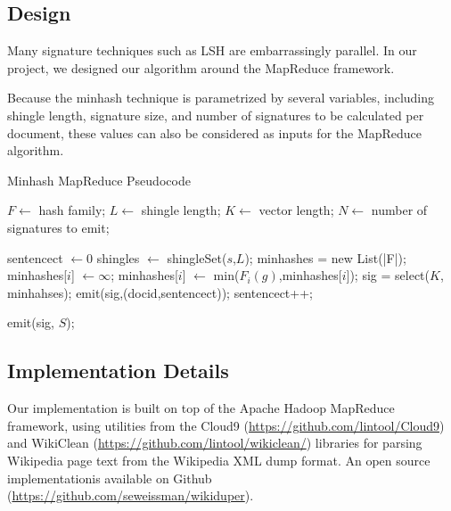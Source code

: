 \documentclass{acm_proc_article-sp}
\begin{document}
\subsection{Design}
Many signature techniques such as LSH are embarrassingly parallel. In our project, we designed our algorithm around the MapReduce framework.

Because the minhash technique is parametrized by several variables, including shingle length, signature size, and number of signatures to be calculated per document, these values can also be considered as inputs for the MapReduce algorithm.

\begin{table}
\begin{algorithm}[H]
\caption{Minhash MapReduce Pseudocode}
\begin{algorithmic}
 \State $F \gets $ hash family;
 \State $L \gets $ shingle length;
 \State $K \gets $ vector length;
 \State $N \gets $ number of signatures to emit;
\EndFunction

 \State sentencect $\gets 0$
  \State shingles $\gets$ shingleSet($s$,$L$);
  \State minhashes = new List(|F|);
    \State minhashes[$i$] $\gets \infty$;
   \EndFor
     \State minhashes[$i$] $\gets$ min($F_i(g)$,minhashes[$i$]);
    \EndFor
   \EndFor
   \State sig = select($K$, minhahses);
   \State emit(sig,(docid,sentencect));
  \EndFor
  \State  sentencect++;
 \EndWhile
\EndFunction

\State emit(sig, $S$);
\EndIf
\EndFunction
\end{algorithmic}
\end{algorithm}
\end{table}

\subsection{Implementation Details}

Our implementation is built on top of the Apache Hadoop MapReduce framework, using utilities from the Cloud9 (\url{https://github.com/lintool/Cloud9}) and WikiClean (\url{https://github.com/lintool/wikiclean/}) libraries for parsing Wikipedia page text from the Wikipedia XML dump format. An open source implementationis available on Github (\url{https://github.com/seweissman/wikiduper}).
\end{document}
